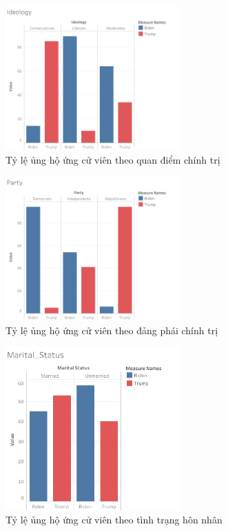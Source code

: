 \documentclass[14pt, a4paper]{article}
\numberwithin{equation}{section}
\numberwithin{figure}{section}
\numberwithin{dl}{section}
\numberwithin{md}{section}
\numberwithin{bd}{section}
\numberwithin{dn}{section}
\numberwithin{hq}{section}
\begin{document}
    \begin{figure}[h!]
        \centering
        \includegraphics[width=0.6\textwidth]{figures/Ideology.png}
        \caption{Tỷ lệ ủng hộ ứng cử viên theo quan điểm chính trị}
    \end{figure}

    \begin{figure}[h!]
        \centering
        \includegraphics[width=0.6\textwidth]{figures/Party.png}
        \caption{Tỷ lệ ủng hộ ứng cử viên theo đảng phái chính trị}
    \end{figure}

    \begin{figure}[h!]
        \centering
        \includegraphics[width=0.6\textwidth]{figures/Marital_Status.png}
        \caption{Tỷ lệ ủng hộ ứng cử viên theo tình trạng hôn nhân}
    \end{figure}
\end{document}
